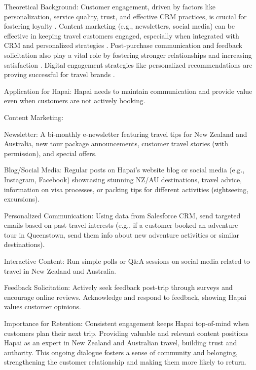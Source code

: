 \documentclass{article}
\begin{document}
Theoretical Background:
Customer engagement, driven by factors like personalization, service quality, trust, and effective CRM practices, is crucial for fostering loyalty \cite{ayub_artificial_2025}. Content marketing (e.g., newsletters, social media) can be effective in keeping travel customers engaged, especially when integrated with CRM and personalized strategies \cite{pookandy_enhancing_nodate}. Post-purchase communication and feedback solicitation also play a vital role by fostering stronger relationships and increasing satisfaction \cite{mabzor_customer_2023}. Digital engagement strategies like personalized recommendations are proving successful for travel brands \cite{karthiyayini_personalized_nodate}.

Application for Hapai:
Hapai needs to maintain communication and provide value even when customers are not actively booking.

Content Marketing:

Newsletter: A bi-monthly e-newsletter featuring travel tips for New Zealand and Australia, new tour package announcements, customer travel stories (with permission), and special offers.

Blog/Social Media: Regular posts on Hapai’s website blog or social media (e.g., Instagram, Facebook) showcasing stunning NZ/AU destinations, travel advice, information on visa processes, or packing tips for different activities (sightseeing, excursions).

Personalized Communication: Using data from Salesforce CRM, send targeted emails based on past travel interests (e.g., if a customer booked an adventure tour in Queenstown, send them info about new adventure activities or similar destinations).

Interactive Content: Run simple polls or Q\&A sessions on social media related to travel in New Zealand and Australia.

Feedback Solicitation: Actively seek feedback post-trip through surveys and encourage online reviews. Acknowledge and respond to feedback, showing Hapai values customer opinions.

Importance for Retention:
Consistent engagement keeps Hapai top-of-mind when customers plan their next trip. Providing valuable and relevant content positions Hapai as an expert in New Zealand and Australian travel, building trust and authority. This ongoing dialogue fosters a sense of community and belonging, strengthening the customer relationship and making them more likely to return.
\end{document}
